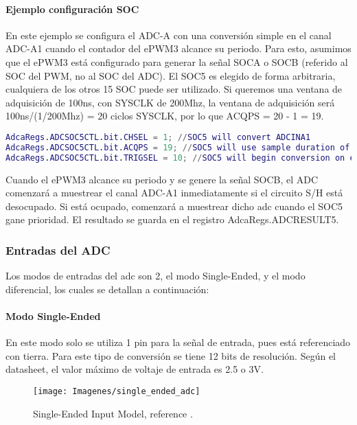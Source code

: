\paragraph{Ejemplo configuración SOC}
\hfill \break \par
En este ejemplo se configura el ADC-A con una conversión simple en el canal ADC-A1 cuando el contador del ePWM3 alcance su periodo. Para esto, asumimos que el ePWM3 está configurado para generar la señal SOCA o SOCB (referido al SOC del PWM, no al SOC del ADC). El SOC5 es elegido de forma arbitraria, cualquiera de los otros 15 SOC puede ser utilizado.
Si queremos una ventana de adquisición de 100ns, con SYSCLK de 200Mhz, la ventana de adquisición será 100ns/(1/200Mhz) = 20 ciclos SYSCLK, por lo que ACQPS = 20 - 1 = 19.\\

\scriptsize	
\begin{lstlisting}[language=Matlab]
AdcaRegs.ADCSOC5CTL.bit.CHSEL = 1; //SOC5 will convert ADCINA1
AdcaRegs.ADCSOC5CTL.bit.ACQPS = 19; //SOC5 will use sample duration of 20 SYSCLK cycles
AdcaRegs.ADCSOC5CTL.bit.TRIGSEL = 10; //SOC5 will begin conversion on ePWM3 SOCB
\end{lstlisting}
\normalsize

Cuando el ePWM3 alcance su periodo y se genere la señal SOCB, el ADC comenzará a muestrear el canal ADC-A1 inmediatamente si el circuito S/H está desocupado. Si está ocupado, comenzará a muestrear dicho adc cuando el SOC5 gane prioridad.
El resultado se guarda en el registro AdcaRegs.ADCRESULT5.


\subsubsection{Entradas del ADC}
Los modos de entradas del adc son 2, el modo Single-Ended, y el modo diferencial, los cuales se detallan a continuación:

\paragraph{Modo Single-Ended}
En este modo solo se utiliza 1 pin para la señal de entrada, pues está referenciado con tierra. Para este tipo de conversión se tiene 12 bits de resolución. Según el datasheet, el valor máximo de voltaje de entrada es 2.5 o 3V.

\begin{figure}[h]
	\centering
	\texttt{[image: Imagenes/single\_ended\_adc]}
	\caption{Single-Ended Input Model, reference \cite[page 1560]{tmr}.}
	\label{fig:4}
\end{figure}

